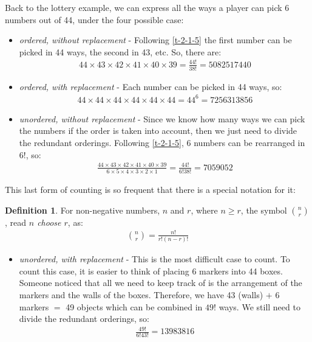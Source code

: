 \documentclass[
  oneside,
  11pt, a4paper,
  footinclude=true,
  headinclude=true,
  cleardoublepage=empty
]{scrbook}
\theoremstyle{definition}
\newtheorem{definition}{Definition}[section]
\theoremstyle{definition}
\begin{document}
        Back to the lottery example, we can express all the ways a player can pick 6 numbers out of 44, under the four possible case:
        
        \begin{itemize}
            \item \emph{ordered, without replacement} - Following \ref{t-2-1-5} the first number can be picked in 44 ways, the second in 43, etc. So, there are:
            \begin{align*}
                44 \times 43 \times 42 \times 41 \times 40 \times 39 = \frac{44!}{38!} = 5082517440
            \end{align*}{}
            \item \emph{ordered, with replacement} - Each number can be picked in 44 ways, so:
            \begin{align*}
                44 \times 44 \times 44 \times 44 \times 44 \times 44 = 44^6 = 7256313856
            \end{align*}{}
            \item \emph{unordered, without replacement} - Since we know how many ways we can pick the numbers if the order is taken into account, then we just need to divide the redundant orderings. Following \ref{t-2-1-5}, 6 numbers can be rearranged in $6!$, so:
            \begin{align*}
                \frac{44 \times 43 \times 42 \times 41 \times 40 \times 39}{6 \times 5 \times 4 \times 3 \times 2 \times 1} = \frac{44!}{6!38!} = 7059052
            \end{align*}{}
        \end{itemize}{}
        
        This last form of counting is so frequent that there is a special notation for it:
        
        \begin{definition}{For non-negative numbers, $n$ and $r$, where $n \geq r$, the symbol $\binom{n}{r}$, read \emph{$n$ choose $r$}, as:}
            \begin{align*}
                \binom{n}{r} = \frac{n!}{r!(n-r)!}
            \end{align*}{}
        \end{definition}{}
       \begin{itemize}
            \item \emph{unordered, with replacement} - This is the most difficult case to count. To count this case, it is easier to think of placing 6 markers into 44 boxes. Someone noticed \citep{feller-vol-2} that all we need to keep track of is the arrangement of the markers and the walls of the boxes. Therefore, we have 43 (walls) $+$ 6 markers $=$ 49 objects which can be combined in $49!$ ways. We still need to divide the redundant orderings, so: 
            \begin{align*}
                \frac{49!}{6!43!} = 13983816
            \end{align*}{}
        \end{itemize}{}
        
\end{document}
